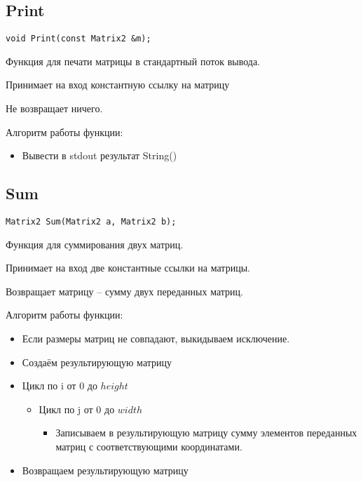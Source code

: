 \documentclass[12pt,a4paper]{article}  %
\begin{document}
	\subsection*{Print}

	\begin{lstlisting}[label={lst:Print}]
		void Print(const Matrix2 &m);
	\end{lstlisting}

	Функция для печати матрицы в стандартный поток вывода.

	Принимает на вход константную ссылку на матрицу

	Не возвращает ничего.

	Алгоритм работы функции:

	\begin{itemize}
		\item Вывести в stdout результат String()
	\end{itemize}

	\subsection*{Sum}

	\begin{lstlisting}[label={lst:Sum}]
		Matrix2 Sum(Matrix2 a, Matrix2 b);
	\end{lstlisting}

	Функция для суммирования двух матриц.

	Принимает на вход две константные ссылки на матрицы.

	Возвращает матрицу -- сумму двух переданных матриц.

	Алгоритм работы функции:

	\begin{itemize}
		\item Если размеры матриц не совпадают, выкидываем исключение.
		\item Создаём результирующую матрицу
		\item Цикл по i от 0 до $ height $
		\begin{itemize}
			\item Цикл по j от 0 до $ width $
			\begin{itemize}
				\item Записываем в результирующую матрицу сумму
				элементов переданных матриц с соответствующими координатами.
			\end{itemize}
		\end{itemize}
		\item Возвращаем результирующую матрицу
	\end{itemize}
\end{document}
